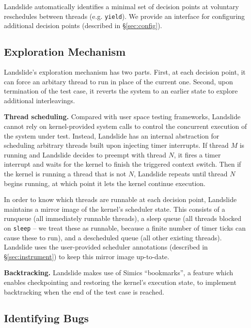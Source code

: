 \documentclass{llncs}
\begin{document}
Landslide automatically identifies a minimal set of decision points at voluntary reschedules between threads (e.g. \texttt{yield}). We provide an interface for configuring additional decision points (described in \S\ref{sec:config}).

\subsection{Exploration Mechanism}

Landslide's exploration mechanism has two parts. First, at each decision point, it can force an arbitary thread to run in place of the current one. Second, upon termination of the test case, it reverts the system to an earlier state to explore additional interleavings.

{\bf Thread scheduling.} Compared with user space testing frameworks, Landslide cannot rely on kernel-provided system calls to control the concurrent execution of the system under test. Instead, Landslide has an internal abstraction for scheduling arbitrary threads built upon injecting timer interrupts.
If thread $M$ is running and Landslide decides to preempt with thread $N$, it fires a timer interrupt and waits for the kernel to finish the triggered context switch. Then if the kernel is running a thread that is not $N$, Landslide repeats until thread $N$ begins running, at which point it lets the kernel continue execution.

In order to know which threads are runnable at each decision point, Landslide maintains a mirror image of the kernel's scheduler state. This consists of a runqueue (all immediately runnable threads), a sleep queue (all threads blocked on \texttt{sleep} -- we treat these as runnable, because a finite number of timer ticks can cause these to run), and a descheduled queue (all other existing threads).
Landslide uses the user-provided scheduler annotations (described in \S\ref{sec:instrument}) to keep this mirror image up-to-date.

{\bf Backtracking.} Landslide makes use of Simics ``bookmarks'', a feature
which enables checkpointing and restoring the kernel's execution state, to implement
backtracking when the end of the test case is reached.

\subsection{Identifying Bugs}

\end{document}
